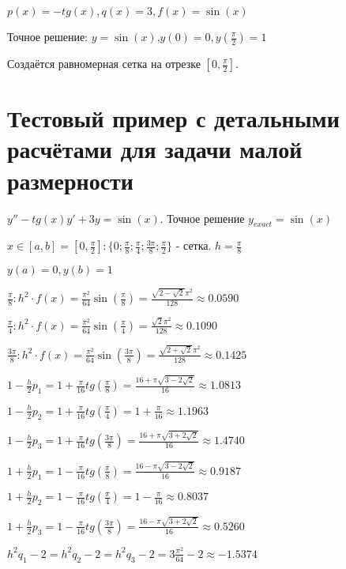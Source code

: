 \documentclass{article}
\begin{document}
	$p(x) =-tg(x), q(x) = 3, f(x) = \sin(x)$
	
	Точное решение: $y = \sin(x)$,$y(0) = 0, y(\frac{\pi}{2}) = 1$
	
	Создаётся равномерная сетка на отрезке $[0 , \frac{\pi}{2}]$.
	
	\section{Тестовый пример с детальными расчётами для задачи малой размерности}
	$y'' -tg(x)y' +3y = \sin(x)$. Точное решение $y_{exact} = \sin(x)$
	
	$x \in[a, b] = [0 , \frac{\pi}{2}] : \{0 ; \frac{\pi}{8}; \frac{\pi}{4}; \frac{3\pi}{8}; \frac{\pi}{2}\}$ - сетка. $h = \frac{\pi}{8}$
	
	$y(a) = 0, y(b) = 1$
	
	$\frac{\pi}{8}: h^2\cdot f(x) = \frac{\pi^2}{64} \sin(\frac{\pi}{8}) = \frac{\sqrt{2-\sqrt{2}}\pi^2}{128} \approx 0.0590$
	
	$\frac{\pi}{4}: h^2\cdot f(x) = \frac{\pi^2}{64} \sin(\frac{\pi}{4}) = \frac{\sqrt{2}\pi^2}{128} \approx 0.1090$
	
	$\frac{3\pi}{8}: h^2\cdot f(x) = \frac{\pi^2}{64} \sin(\frac{3\pi}{8}) = \frac{\sqrt{2+\sqrt{2}}\pi^2}{128} \approx 0.1425$
	
	$1- \frac{h}{2}p_1 = 1 + \frac{\pi}{16}tg(\frac{\pi}{8}) = \frac{16 + \pi\sqrt{3-2\sqrt{2}}}{16} \approx 1.0813$
	
	$1- \frac{h}{2}p_2 = 1 + \frac{\pi}{16}tg(\frac{\pi}{4}) = 1 + \frac{\pi}{16} \approx 1.1963$
	
	$1- \frac{h}{2}p_3 = 1 + \frac{\pi}{16}tg(\frac{3\pi}{8}) = \frac{16 + \pi\sqrt{3+2\sqrt{2}}}{16} \approx 1.4740$
	
	$1+ \frac{h}{2}p_1 = 1 - \frac{\pi}{16}tg(\frac{\pi}{8}) = \frac{16 - \pi\sqrt{3-2\sqrt{2}}}{16} \approx 0.9187$
	
	$1+ \frac{h}{2}p_2 = 1 - \frac{\pi}{16}tg(\frac{\pi}{4}) = 1 - \frac{\pi}{16} \approx 0.8037$
	
	$1+ \frac{h}{2}p_3 = 1 - \frac{\pi}{16}tg(\frac{3\pi}{8}) = \frac{16 - \pi\sqrt{3+2\sqrt{2}}}{16} \approx 0.5260$
	
	$h^2q_1 - 2 = h^2q_2 - 2 = h^2q_3 - 2 = 3\frac{\pi^2}{64} - 2 \approx -1.5374$
	
\end{document}
